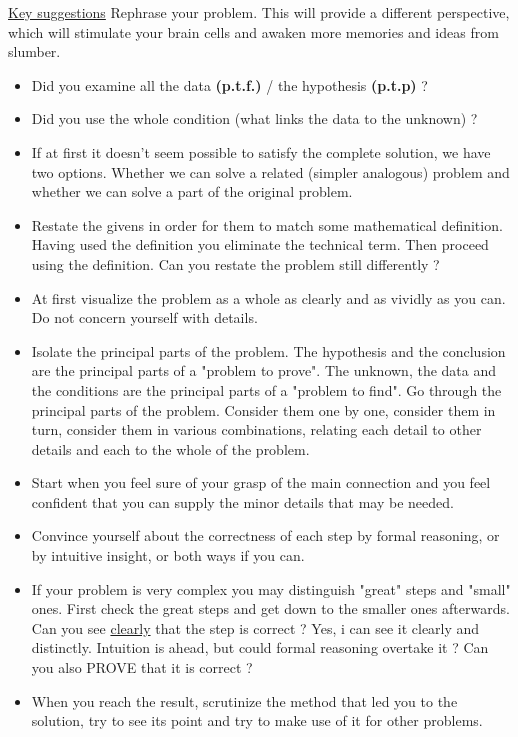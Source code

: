 \documentclass[12pt]{article}
\begin{document}
\begin{flushleft}
	
	\uline{Key suggestions}  \linebreak 
	{\color{red} Rephrase your problem. This will provide a different perspective, which will stimulate your brain cells and awaken more memories and ideas from slumber}. 
	
	\begin{itemize}
	\item Did you examine all the data \textbf{(p.t.f.)} / the hypothesis \textbf{(p.t.p)} ? 
	\item Did you use the whole condition (what links the data to the unknown) ? 
	\item If at first it doesn't seem possible to satisfy the complete solution, we have two options. Whether we can solve a related (simpler analogous) problem and whether we can solve a part of the original problem. 
	\item Restate the givens in order for them to match some mathematical definition. Having used the definition you eliminate the technical term. Then proceed using the definition. Can you restate the problem still differently ? 
	 \item At first visualize the problem as a whole as clearly and as vividly as you can. Do not concern yourself with details. 
	 \item Isolate the principal parts of the problem. The hypothesis and the conclusion are the principal parts of a "problem to prove". The unknown, the data and the conditions are the principal parts of a "problem to find". Go through the principal parts of the problem. Consider them one by one, consider them in turn, consider them in various combinations, relating each detail to other details and each to the whole of the problem. 
	 \item Start when you feel sure of your grasp of the main connection and you feel confident that you can supply the minor details that may be needed. 
	 \item Convince yourself about the correctness of each step by formal reasoning, or by intuitive insight, or both ways if you can. 
	 \item If your problem is very complex you may distinguish "great" steps and "small" ones. First check the great steps and get down to the smaller ones afterwards. Can you see \uline{clearly} that the step is correct ? Yes, i can see it clearly and distinctly. Intuition is ahead, but could formal reasoning overtake it ? Can you also PROVE that it is correct ? 
	 \item When you reach the result, scrutinize the method that led you to the solution, try to see its point and try to make use of it for other problems. 

\end{itemize}
\end{flushleft}
\end{document}
